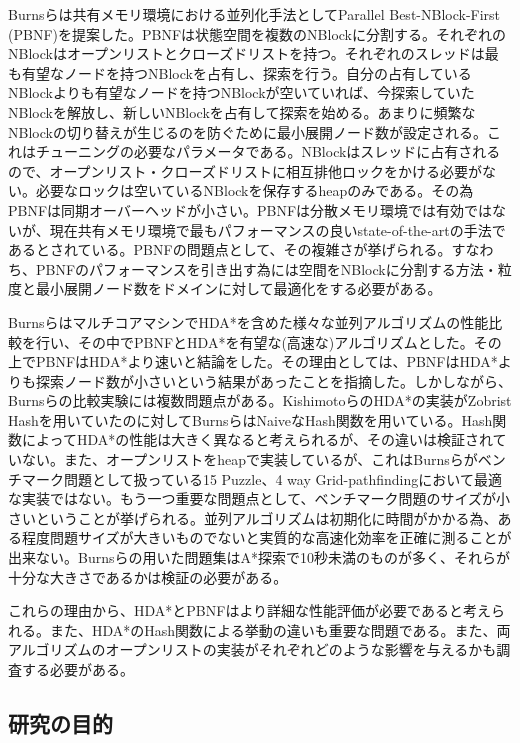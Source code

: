 \documentclass[uplatex]{jsarticle}
\begin{document}
Burnsらは共有メモリ環境における並列化手法としてParallel Best-NBlock-First (PBNF)を提案した\cite{Burns2010}。PBNFは状態空間を複数のNBlockに分割する。それぞれのNBlockはオープンリストとクローズドリストを持つ。それぞれのスレッドは最も有望なノードを持つNBlockを占有し、探索を行う。自分の占有しているNBlockよりも有望なノードを持つNBlockが空いていれば、今探索していたNBlockを解放し、新しいNBlockを占有して探索を始める。あまりに頻繁なNBlockの切り替えが生じるのを防ぐために最小展開ノード数が設定される。これはチューニングの必要なパラメータである。NBlockはスレッドに占有されるので、オープンリスト・クローズドリストに相互排他ロックをかける必要がない。必要なロックは空いているNBlockを保存するheapのみである。その為PBNFは同期オーバーヘッドが小さい。PBNFは分散メモリ環境では有効ではないが、現在共有メモリ環境で最もパフォーマンスの良いstate-of-the-artの手法であるとされている。PBNFの問題点として、その複雑さが挙げられる。すなわち、PBNFのパフォーマンスを引き出す為には空間をNBlockに分割する方法・粒度と最小展開ノード数をドメインに対して最適化をする必要がある。
\newline

BurnsらはマルチコアマシンでHDA*を含めた様々な並列アルゴリズムの性能比較を行い、その中でPBNFとHDA*を有望な(高速な)アルゴリズムとした。その上でPBNFはHDA*より速いと結論をした。その理由としては、PBNFはHDA*よりも探索ノード数が小さいという結果があったことを指摘した。しかしながら、Burnsらの比較実験には複数問題点がある。KishimotoらのHDA*の実装がZobrist Hash\cite{Zobrist1970}を用いていたのに対してBurnsらはNaiveなHash関数を用いている。Hash関数によってHDA*の性能は大きく異なると考えられるが、その違いは検証されていない。また、オープンリストをheapで実装しているが、これはBurnsらがベンチマーク問題として扱っている15 Puzzle、4 way Grid-pathfindingにおいて最適な実装ではない\cite{Burns2012implementing}。もう一つ重要な問題点として、ベンチマーク問題のサイズが小さいということが挙げられる。並列アルゴリズムは初期化に時間がかかる為、ある程度問題サイズが大きいものでないと実質的な高速化効率を正確に測ることが出来ない。Burnsらの用いた問題集はA*探索で10秒未満のものが多く、それらが十分な大きさであるかは検証の必要がある。
\newline

これらの理由から、HDA*とPBNFはより詳細な性能評価が必要であると考えられる。また、HDA*のHash関数による挙動の違いも重要な問題である。また、両アルゴリズムのオープンリストの実装がそれぞれどのような影響を与えるかも調査する必要がある。

\subsection{研究の目的}
\end{document}
